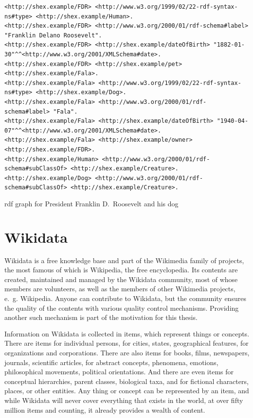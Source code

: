 \begin{sidewayslisting}
\begin{lstlisting}
<http://shex.example/FDR> <http://www.w3.org/1999/02/22-rdf-syntax-ns#type> <http://shex.example/Human>.
<http://shex.example/FDR> <http://www.w3.org/2000/01/rdf-schema#label> "Franklin Delano Roosevelt".
<http://shex.example/FDR> <http://shex.example/dateOfBirth> "1882-01-30"^^<http://www.w3.org/2001/XMLSchema#date>.
<http://shex.example/FDR> <http://shex.example/pet> <http://shex.example/Fala>.
<http://shex.example/Fala> <http://www.w3.org/1999/02/22-rdf-syntax-ns#type> <http://shex.example/Dog>.
<http://shex.example/Fala> <http://www.w3.org/2000/01/rdf-schema#label> "Fala".
<http://shex.example/Fala> <http://shex.example/dateOfBirth> "1940-04-07"^^<http://www.w3.org/2001/XMLSchema#date>.
<http://shex.example/Fala> <http://shex.example/owner> <http://shex.example/FDR>.
<http://shex.example/Human> <http://www.w3.org/2000/01/rdf-schema#subClassOf> <http://shex.example/Creature>.
<http://shex.example/Dog> <http://www.w3.org/2000/01/rdf-schema#subClassOf> <http://shex.example/Creature>.
\end{lstlisting}
\caption{\acrshort{rdf} graph for President Franklin D.~Roosevelt and his dog}
\label{lst:rdf-example}
\end{sidewayslisting}

\section{Wikidata}
\label{sec:Background:Wikidata}

\Gls{Wikidata} \cite{Vrandecic:2014:WFC:2661061.2629489}
is a free knowledge base
and part of the \gls{Wikimedia} family of projects,
the most famous of which is \gls{Wikipedia}, the free encyclopedia.
Its contents are created, maintained and managed by the \gls{Wikidata} community,
most of whose members are volunteers,
as well as the members of other \gls{Wikimedia} projects, e.~g. \gls{Wikipedia}.
Anyone can contribute to \gls{Wikidata},
but the community ensures the quality of the contents with various quality control mechanisms.
Providing another such mechanism is part of the motivation for this thesis.

Information on \gls{Wikidata} is collected in \glspl{item},
which represent things or concepts.
There are \glspl{item} for individual persons,
for cities, states, geographical features,
for organizations and corporations.
There are also \glspl{item} for books, films, newspapers, journals, scientific articles,
for abstract concepts, phenomena, emotions, philosophical movements, political orientations.
And there are even \glspl{item} for conceptual hierarchies, parent classes, biological taxa,
and for fictional characters, places, or other entities.
Any thing or concept can be represented by an \gls{item},
and while \gls{Wikidata} will never cover everything that exists in the world,
at over fifty million \glspl{item} and counting,
it already provides a wealth of content.

